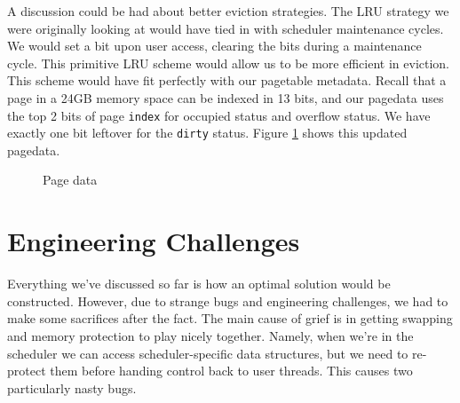 \documentclass{article}
\begin{document}
A discussion could be had about better eviction strategies. The LRU strategy we were originally looking at would have tied in with scheduler maintenance cycles. We would set a  bit upon user access, clearing the bits during a maintenance cycle. This primitive LRU scheme would allow us to be more efficient in eviction. This scheme would have fit perfectly with our pagetable metadata. Recall that a page in a 24GB memory space can be indexed in 13 bits, and our pagedata uses the top 2 bits of page \verb|index| for occupied status and overflow status. We have exactly one bit leftover for the \verb|dirty| status. Figure \ref{fig:eviction_page_data} shows this updated pagedata.

\begin{figure}
\centering
{}
\caption{Page data}
\label{fig:eviction_page_data}
\end{figure}

\section{Engineering Challenges}
Everything we've discussed so far is how an optimal solution would be constructed. However, due to strange bugs and engineering challenges, we had to make some sacrifices after the fact. The main cause of grief is in getting swapping and memory protection to play nicely together. Namely, when we're in the scheduler we can access scheduler-specific data structures, but we need to re-protect them before handing control back to user threads. This causes two particularly nasty bugs.
\end{document}
